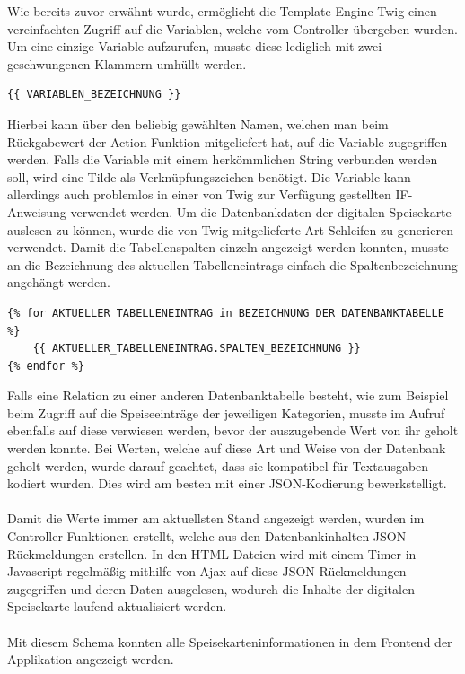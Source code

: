 Wie bereits zuvor erwähnt wurde, ermöglicht die Template Engine Twig einen vereinfachten Zugriff auf die Variablen, welche vom Controller übergeben wurden. Um eine einzige Variable aufzurufen, musste diese lediglich mit zwei geschwungenen Klammern umhüllt werden. 
\lstset{language = php}
  	\begin{lstlisting}
{{ VARIABLEN_BEZEICHNUNG }}
\end{lstlisting}
Hierbei kann über den beliebig gewählten Namen, welchen man beim Rückgabewert der Action-Funktion mitgeliefert hat, auf die Variable zugegriffen werden. 
Falls die Variable mit einem herkömmlichen String verbunden werden soll, wird eine Tilde als Verknüpfungszeichen benötigt. 
Die Variable kann allerdings auch problemlos in einer von Twig zur Verfügung gestellten IF-Anweisung verwendet werden.
Um die Datenbankdaten der digitalen Speisekarte auslesen zu können, wurde die von Twig mitgelieferte Art Schleifen zu generieren verwendet. Damit die Tabellenspalten einzeln angezeigt werden konnten, musste an die Bezeichnung des aktuellen Tabelleneintrags einfach die Spaltenbezeichnung angehängt werden. 
\lstset{language = php}
  	\begin{lstlisting}
{% for AKTUELLER_TABELLENEINTRAG in BEZEICHNUNG_DER_DATENBANKTABELLE %}
	{{ AKTUELLER_TABELLENEINTRAG.SPALTEN_BEZEICHNUNG }}
{% endfor %}
	\end{lstlisting}
Falls eine Relation zu einer anderen Datenbanktabelle besteht, wie zum Beispiel beim Zugriff auf die Speiseeinträge der jeweiligen Kategorien, musste im Aufruf ebenfalls auf diese verwiesen werden, bevor der auszugebende Wert von ihr geholt werden konnte.
Bei Werten, welche auf diese Art und Weise von der Datenbank geholt werden, wurde darauf geachtet, dass sie kompatibel für Textausgaben kodiert wurden. Dies wird am besten mit einer JSON-Kodierung bewerkstelligt.
\\ \\
Damit die Werte immer am aktuellsten Stand angezeigt werden, wurden im Controller Funktionen erstellt, welche aus den Datenbankinhalten JSON-Rückmeldungen erstellen.
In den HTML-Dateien wird mit einem Timer in Javascript regelmäßig mithilfe von Ajax auf diese JSON-Rückmeldungen zugegriffen und deren Daten ausgelesen, wodurch die Inhalte der digitalen Speisekarte laufend aktualisiert werden.
\\ \\
Mit diesem Schema konnten alle Speisekarteninformationen in dem Frontend der Applikation angezeigt werden.

